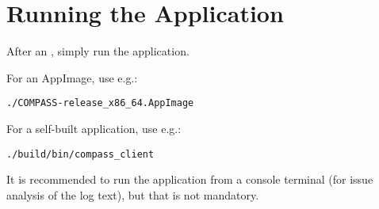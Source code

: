 
\section{Running the Application}

After an , simply run the application.

For an AppImage, use e.g.:
\begin{lstlisting}
./COMPASS-release_x86_64.AppImage
\end{lstlisting}

For a self-built application, use e.g.:
\begin{lstlisting}
./build/bin/compass_client
\end{lstlisting}

It is recommended to run the application from a console terminal (for issue analysis of the log text), but that is not mandatory.
